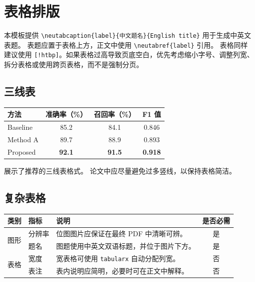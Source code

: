 \section{表格排版}

本模板提供 \verb|\neutabcaption{label}{中文题名}{English title}| 用于生成中英文表题。
表题应置于表格上方，正文中使用 \verb|\neutabref{label}| 引用。
表格同样建议使用 \verb|[!htbp]|。如果表格过高导致页底空白，优先考虑缩小字号、调整列宽、拆分表格或使用跨页表格，而不是强制分页。

\subsection{三线表}

\begin{table}[!htbp]
  \centering
  \begin{tabular}{lccc}
    \toprule
    方法       & 准确率（\%）       & 召回率（\%）       & F1 值           \\
    \midrule
    Baseline & 85.2          & 84.1          & 0.846          \\
    Method A & 89.7          & 88.9          & 0.893          \\
    Proposed & \textbf{92.1} & \textbf{91.5} & \textbf{0.918} \\
    \bottomrule
  \end{tabular}
\end{table}

 展示了推荐的三线表格式。
论文中应尽量避免过多竖线，以保持表格简洁。

\subsection{复杂表格}
\begin{table}[!htbp]
  \centering
  \begin{tabularx}{\textwidth}{llXc}
    \toprule
    类别                  & 指标  & 说明                               & 是否必需 \\
    \midrule
    \multirow{2}{*}{图形} & 分辨率 & 位图图片应保证在最终 PDF 中清晰可辨。            & 是    \\
                        & 题名  & 图题使用中英文双语标题，并位于图片下方。             & 是    \\
    \midrule
    \multirow{2}{*}{表格} & 宽度  & 宽表格可使用 \texttt{tabularx} 自动分配列宽。 & 否    \\
                        & 表注  & 表内说明应简明，必要时可在正文中解释。              & 否    \\
    \bottomrule
  \end{tabularx}
\end{table}

